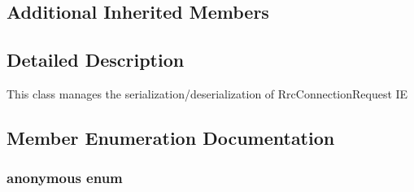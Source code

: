 \subsection*{Additional Inherited Members}


\subsection{Detailed Description}
This class manages the serialization/deserialization of Rrc\+Connection\+Request IE 

\subsection{Member Enumeration Documentation}
\subsubsection[{\texorpdfstring{anonymous enum}{anonymous enum}}]{\setlength{\rightskip}{0pt plus 5cm}anonymous enum\hspace{0.3cm}{\ttfamily [private]}}\hypertarget{classns3_1_1RrcConnectionRequestHeader_ac8740d50774d7543ae4e2def0edc63cf}{}\label{classns3_1_1RrcConnectionRequestHeader_ac8740d50774d7543ae4e2def0edc63cf}
